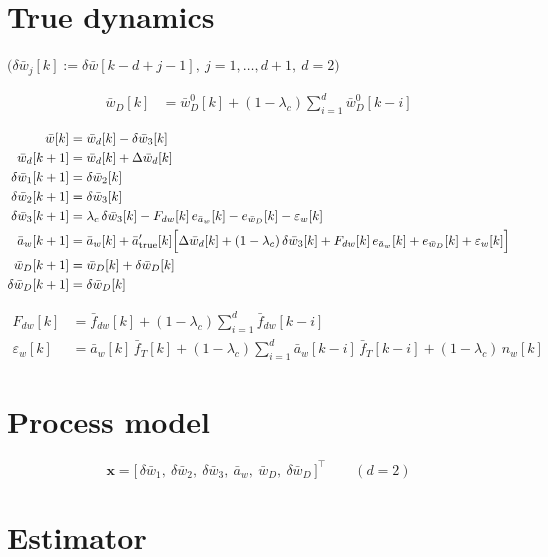 \documentclass[11pt,a4paper,fontset=none]{ctexart}
\newcommand{\ba}{\bar{a}}
\newcommand{\bw}{\bar{w}}
\newcommand{\bwD}{\bar{w}_D}
\begin{document}
\section{True dynamics}

$\bigl(\delta\bw_j[k] := \delta\bw[k-d+j-1],\ j = 1,\dots,d+1,\ d = 2\bigr)$

\begin{align*}
\bwD[k] &= \bwD^{0}[k]
  + (1-\lambda_c)\sum_{i=1}^{d}\bwD^{0}[k-i]
\end{align*}

\begin{align*}
\bw[k]           &= \bw_d[k] - \delta\bw_3[k] \\
\bw_d[k+1]       &= \bw_d[k] + \Delta\bw_d[k] \\
\delta\bw_1[k+1] &= \delta\bw_2[k] \\
\delta\bw_2[k+1] &= \delta\bw_3[k] \\
\delta\bw_3[k+1] &= \lambda_c\,\delta\bw_3[k] - F_{dw}[k]\,e_{\ba_w}[k]
                    - e_{\bwD}[k] - \varepsilon_w[k] \\
\ba_w[k+1]       &= \ba_w[k] + \ba'_{\mathrm{true}}[k]\Bigl[
                    \Delta\bw_d[k] + (1-\lambda_c)\,\delta\bw_3[k]
                    + F_{dw}[k]\,e_{\ba_w}[k] + e_{\bwD}[k]
                    + \varepsilon_w[k]\Bigr] \\
\bwD[k+1]        &= \bwD[k] + \delta\bwD[k] \\
\delta\bwD[k+1]  &= \delta\bwD[k]
\end{align*}

\begin{align*}
F_{dw}[k] &= \bar{f}_{dw}[k] + (1-\lambda_c)\sum_{i=1}^{d}\bar{f}_{dw}[k-i] \\
\varepsilon_w[k] &= \ba_w[k]\,\bar{f}_T[k]
  + (1-\lambda_c)\sum_{i=1}^{d}\ba_w[k-i]\,\bar{f}_T[k-i]
  + (1-\lambda_c)\,n_w[k]
\end{align*}

\section{Process model}

\begin{equation*}
\mathbf{x} = \bigl[\,\delta\bw_1,\ \delta\bw_2,\ \delta\bw_3,\ \ba_w,\
\bwD,\ \delta\bwD\,\bigr]^{\top}
\qquad (d = 2)
\end{equation*}

\section{Estimator}
\end{document}
